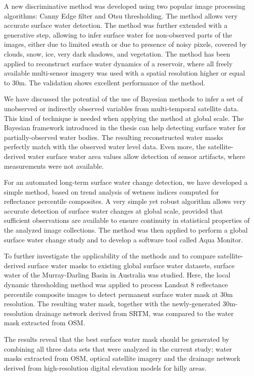 A new discriminative method was developed using two popular image processing algorithms: Canny Edge filter and Otsu thresholding. The method allows very accurate surface water detection. The method was further extended with a generative step, allowing  to infer surface water for non-observed parts of the images, either due to limited swath or due to presence of noisy pixels, covered by clouds, snow, ice, very dark shadows, and vegetation. The method has been applied to reconstruct surface water dynamics of a reservoir, where all freely available multi-sensor imagery was used with a spatial resolution higher or equal to 30m. The validation shows excellent performance of the method. 

We have discussed the potential of the use of Bayesian methods to infer a set of unobserved or indirectly observed variables from multi-temporal satellite data. This kind of technique is needed when applying the method at global scale. The Bayesian framework introduced in the thesis can help detecting surface water for partially-observed water bodies. The resulting reconstructed water masks perfectly match with the observed water level data. Even more, the satellite-derived water surface water area values allow detection of sensor artifacts, where measurements were not available. 

For an automated long-term surface water change detection, we have developed a simple method, based on trend analysis of wetness indices computed for reflectance percentile composites. A very simple yet robust algorithm allows very accurate detection of surface water changes at global scale, provided that sufficient observations are available to ensure continuity in statistical properties of the analyzed image collections. The method was then applied to perform a global surface water change study and to develop a software tool called Aqua Monitor.

To further investigate the applicability of the methods and to compare satellite-derived surface water masks to existing global surface water datasets, surface water of the Murray-Darling Basin in Australia was studied. Here, the local dynamic thresholding method was applied to process Landsat 8 reflectance percentile composite images to detect permanent surface water mask at 30m resolution. The resulting water mask, together with the newly-generated 30m-resolution drainage network derived from \gls{SRTM}, was compared to the water mask extracted from OSM.

The results reveal that the best surface water mask should be generated by combining all three data sets that were analyzed in the current study; water masks extracted from OSM, optical satellite imagery and the drainage network derived from high-resolution digital elevation models for hilly areas.

